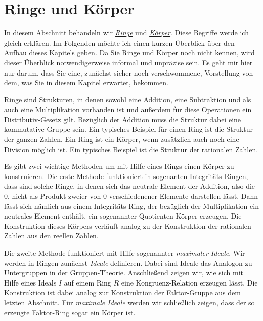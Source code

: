 \chapter{Ringe und Körper}
In diesem Abschnitt behandeln wir 
\href{http://de.wikipedia.org/wiki/Ring_(Algebra)}{\emph{Ringe}} und 
\href{http://en.wikipedia.org/wiki/Field_(mathematics)}{\emph{Körper}}.  Diese Begriffe werde ich gleich erklären.
Im Folgenden möchte ich einen kurzen Überblick über den Aufbau dieses Kapitels geben.  Da Sie Ringe und
Körper  noch nicht kennen, wird dieser Überblick notwendigerweise informal und
unpräzise sein.  Es geht mir hier nur darum, dass Sie eine, zunächst sicher noch verschwommene, Vorstellung
von dem, was Sie in diesem Kapitel erwartet, bekommen.

Ringe sind Strukturen, in denen
sowohl eine Addition, eine Subtraktion und als auch eine Multiplikation vorhanden ist und außerdem für diese
Operationen ein Distributiv-Gesetz gilt.  Bezüglich der Addition muss die Struktur dabei eine kommutative
Gruppe sein. Ein typisches Beispiel für einen Ring ist die Struktur der ganzen
Zahlen. Ein Ring ist ein Körper, wenn zusätzlich auch noch eine Division möglich ist.
Ein typisches Beispiel ist die Struktur der rationalen Zahlen.

Es gibt zwei wichtige Methoden um mit Hilfe eines Rings einen Körper zu konstruieren.
Die erste Methode funktioniert in sogenanten Integritäts-Ringen, dass sind solche Ringe, in denen sich 
das neutrale Element der Addition, also die $0$, nicht als Produkt zweier von $0$ verschiedenener Elemente 
darstellen lässt.  Dann lässt sich nämlich aus einem Integritäts-Ring, der bezüglich der
Multiplikation ein 
neutrales Element enthält, ein sogenannter Quotienten-Körper erzeugen.  Die Konstruktion dieses Körpers
verläuft analog zu der Konstruktion der rationalen Zahlen aus den reellen Zahlen.

Die zweite Methode funktioniert mit Hilfe sogenannter \emph{maximaler Ideale}.  Wir werden in Ringen zunächst
\emph{Ideale} definieren.  Dabei sind Ideale das Analogon zu Untergruppen in der Gruppen-Theorie.
Anschließend zeigen wir, wie sich mit Hilfe eines Ideals $I$ auf einem Ring $R$ eine Kongruenz-Relation
erzeugen lässt.  Die Konstruktion ist dabei analog zur Konstruktion der
Faktor-Gruppe aus dem letzten Abschnitt.  Für \emph{maximale Ideale} werden wir schließlich zeigen,
dass der so erzeugte Faktor-Ring sogar ein Körper ist.

